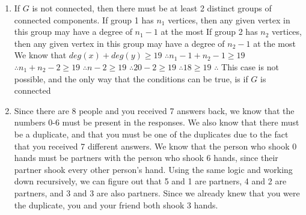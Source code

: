 \documentclass{article}
\begin{document}
\begin{enumerate}
		\item If $G$ is not connected, then there must be at least 2 distinct groups of connected components.
		\newline If group 1 has $n_{1}$ vertices, then any given vertex in this group may have a degree of $n_{1}-1$ at the most
		\newline If group 2 has $n_{2}$ vertices, then any given vertex in this group may have a degree of $n_{2}-1$ at the most
		\newline We know that $deg(x)+deg(y)\geq 19$
		\newline $\therefore n_{1}-1+n_{2}-1\geq 19$
		\newline $\therefore n_{1}+n_{2}-2 \geq 19$
		\newline $\therefore n-2 \geq 19$
		\newline $\therefore 20-2\geq19$
		\newline $\therefore 18\geq19$
		\newline $\therefore$ This case is not possible, and the only way that the conditions can be true, is if $G$ is connected
		
		\newpage
		\item Since there are 8 people and you received 7 answers back, we know that the numbers 0-6 must be present in the responses. We also know that there must be a duplicate, and that you must be one of the duplicates due to the fact that you received 7 different answers.
		\newline We know that the person who shook 0 hands must be partners with the person who shook 6 hands, since their partner shook every other person's hand. Using the same logic and working down recursively, we can figure out that 5 and 1 are partners, 4 and 2 are partners, and 3 and 3 are also partners.
		\newline Since we already knew that you were the duplicate, you and your friend both shook 3 hands.
		

\end{enumerate}
\end{document}
